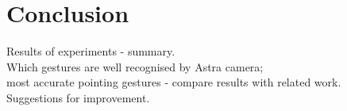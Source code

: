 \chapter*{Conclusion}

Results of experiments - summary.\\
Which gestures are well recognised by Astra camera; \\
most accurate pointing gestures - compare results with related work. \\

Suggestions for improvement.\\

